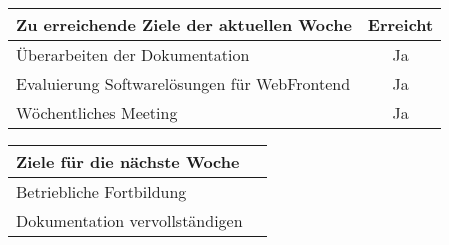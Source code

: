 \begin{tabularx}{\textwidth}{Xc}
    \arrayrulecolor{OliveGreen}
    \toprule
    {\bfseries Zu erreichende Ziele der aktuellen Woche} & {\bfseries Erreicht} \\
    \midrule[2pt]
    Überarbeiten der Dokumentation                        &Ja                \\
    \rowcolor{OliveGreen!15}
   Evaluierung Softwarelösungen für WebFrontend           &Ja                \\
    \rowcolor{OliveGreen!15}
    Wöchentliches Meeting                                 &Ja                \\
   \bottomrule[2pt]
\end{tabularx}
%
\vspace{1cm}
%
\begin{tabularx}{\textwidth}{Xc}
    \arrayrulecolor{OliveGreen}
    \toprule
    {\bfseries Ziele für die nächste Woche}        &                         \\
    \midrule[2pt]
    Betriebliche Fortbildung                       &                         \\
    \rowcolor{OliveGreen!15}
    Dokumentation vervollständigen                 &                         \\
\end{tabularx}
